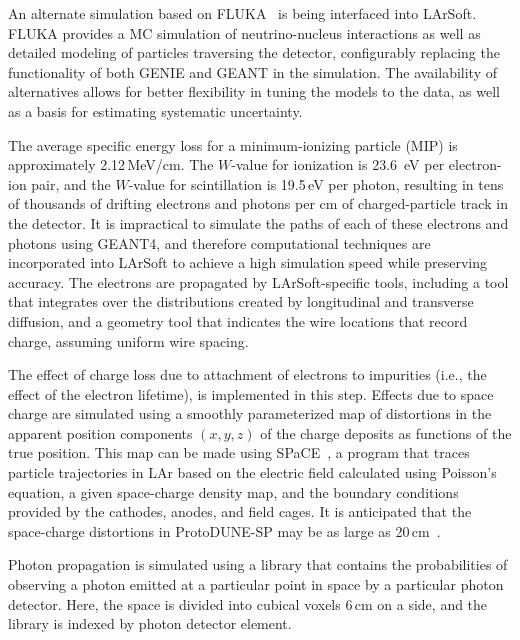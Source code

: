 An alternate simulation based on FLUKA~\cite{Fluka15, Ferrari:2005zk, Battistoni:2009zzb} 
is being interfaced into LArSoft.
FLUKA provides a MC simulation of neutrino-nucleus interactions as well as
detailed modeling of particles traversing the detector, configurably replacing the
functionality of both GENIE and GEANT in the simulation.  The availability of alternatives
allows for better flexibility in tuning the models to the data, as well as a basis for
estimating systematic uncertainty.

The average specific energy loss for a minimum-ionizing particle (MIP)
is approximately 2.12\,MeV/cm.  The $W$-value for ionization is 23.6~eV
per electron-ion pair, and the $W$-value for scintillation is 19.5\,eV
per photon, resulting in tens of thousands of drifting electrons and
photons per cm of charged-particle track in the detector.  It is
impractical to simulate the paths of each of these electrons and 
photons using GEANT4, and therefore computational techniques are incorporated
into LArSoft to achieve a high simulation speed while preserving
accuracy.  The electrons are propagated by LArSoft-specific tools,
including a tool that integrates over the distributions created by longitudinal
and transverse diffusion, 
and a geometry tool that indicates the wire locations that record charge, assuming uniform wire spacing.

The effect of charge loss due to attachment
of electrons to impurities (i.e., the effect of the electron lifetime),  is
implemented in this step.  
Effects due to space charge are simulated using a smoothly parameterized
map of
distortions in the apparent position components $(x,y,z)$ of the charge
deposits as
functions of the true position.
This map can be made using SPaCE~\cite{Mooney:2015kke}, a
program that traces particle trajectories in LAr based on the
electric field calculated using Poisson's equation, a given
space-charge density map, and the boundary conditions provided by the
cathodes, anodes, and field cages.  It is anticipated that the
space-charge distortions in ProtoDUNE-SP may be as large as
20\,cm~\cite{Mooney:2015kke}. 


Photon propagation is simulated using a library that contains the
probabilities of observing a photon emitted at a particular point in
space by a particular photon detector.  Here, the space is divided
into cubical voxels 6\,cm on a side, and the library is indexed by photon
detector element. 

